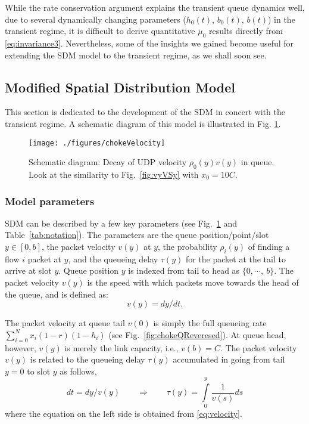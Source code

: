 \documentclass{IEEEtran}
\begin{document}
While the rate conservation argument explains the transient queue dynamics well, due to several dynamically changing parameters ($h_0(t)$, $b_0(t)$, $b(t)$) in the transient regime, it is difficult to derive quantitative $\mu_0$ results directly from \eqref{eq:invariance3}. Nevertheless, some of the insights we gained become useful for extending the SDM model to the transient regime, as we shall soon see.

    \subsection{Modified Spatial Distribution Model}\label{subsec:modifiedSDM}
    This section is dedicated to the development of the SDM in concert with the transient regime. A schematic diagram of this model is illustrated in Fig. \ref{fig:udpVelocityDecay}.

    \begin{figure}[h!]
            \centering
            \texttt{[image: ./figures/chokeVelocity]}\caption{Schematic diagram: Decay of UDP velocity $\rho_0(y)v(y)$ in queue. Look at the similarity to Fig.~\ref{fig:vyVSy} with $x_0=10C$.}
            \label{fig:udpVelocityDecay}
    \end{figure}

    \subsubsection{Model parameters}
SDM can be described by a few key parameters (see Fig.~\ref{fig:udpVelocityDecay} and Table~\ref{tab:notation}). The parameters are the queue position/point/slot $y\in[0,b]$, the packet velocity $v(y)$ at $y$, the probability $\rho_i(y)$ of finding a flow $i$ packet at $y$, and the queueing delay $\tau(y)$ for the packet at the tail to arrive at slot $y$. Queue position $y$ is indexed from tail to head as $\{0,\cdots,~b\}$. The packet velocity $v(y)$ is the speed with which packets move towards the head of the queue, and is defined as:
    \begin{equation}\label{eq:velocity}
v(y)=dy/dt.
    \end{equation}

    The packet velocity at queue tail $v(0)$ is simply the full queueing rate $\sum_{i=0}^N x_i(1-r)(1-h_i)$ (see Fig.~\ref{fig:chokeQReveresed}). At queue head, however, $v(y)$ is merely the link capacity, i.e., $v(b)=C$. The packet velocity $v(y)$ is related to the queueing delay $\tau(y)$ accumulated in going from tail $y=0$ to slot $y$ as follows,
        \begin{equation}\label{eq:qDelay}
        dt=dy/v(y) \qquad \Rightarrow \qquad \tau(y)= \int\limits_0^y \frac{1}{v(s)}ds
    \end{equation}
where the equation on the left side is obtained from \eqref{eq:velocity}.
\end{document}
